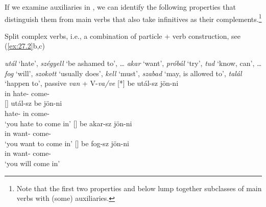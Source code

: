 \documentclass[output=paper]{langsci/langscibook}
\begin{document}
If we examine auxiliaries in , we can identify the following
properties that distinguish them from main verbs that also take infinitives as
their complements.\footnote{Note that the first two properties 
    and  below lump together subclasses of main verbs with (some)
auxiliaries.}\largerpage[-2]

\begin{exe}\label{ex:27.2}
    \ex Split complex verbs, i.e., a combination of particle + verb
    construction, see (\ref{ex:27.2}b,c)\footnotemark
    \begin{xlist}
     \emph{utál} ‘hate’, \emph{szégyell} ‘be ashamed to’, \dots{}
     \emph{akar} ‘want’, \emph{próbál} ‘try’, \emph{tud} ‘know, can’,
        \dots{}
     \emph{fog} ‘will’, \emph{szokott} ‘usually does’, \emph{kell}
        ‘must’, \emph{szabad} ‘may, is allowed to’, \emph{talál} ‘happen to’,
        passive \emph{van} + V-\emph{va/ve}
    [*]{%
        \gll    be   utál-sz     jön-ni \\
                in    hate-\Ssg{}  come-\Inf{}\\}
    []{%
        \gll    utál-sz    be jön-ni \\
                hate-\Ssg{}  in   come-\Inf{}\\
        \glt    ‘you hate to come in’}
    []{%
        \gll    be   akar-sz     jön-ni\\
                in    want-\Ssg{}  come-\Inf{}\\
        \glt    ‘you want to come in’}
    []{%
        \gll    be   fog-sz    jön-ni\\
                in    want-\Ssg{}  come-\Inf{}\\
        \glt    ‘you will come in’}
    \end{xlist}
\end{exe}
\end{document}
